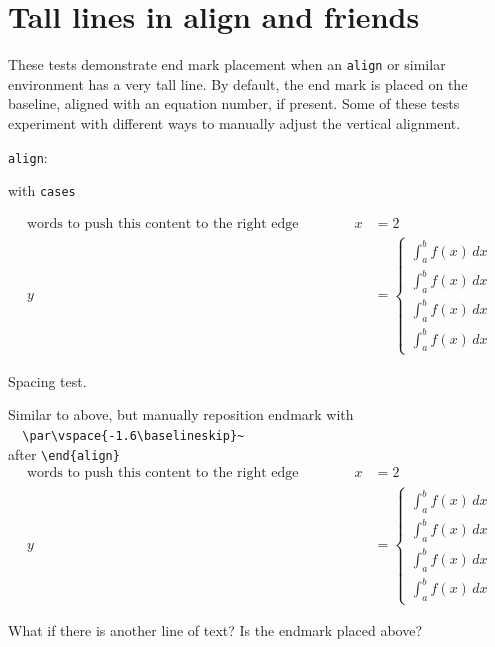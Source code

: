 \documentclass[leqno]{article}
\newcommand{\testtype}[2]{\texttt{#1}:%
  #2}
\newcommand{\makeoutertest}[3]{
  \begin{test}
    \testtype{#1}{#2}
    #3
  \end{test}
}
\newcommand{\maketest}[3]{
  \makeoutertest{#1}{#2}{
    \begin{#1}
      #3
    \end{#1}
  }
}
\begin{document}
\clearpage
\section{Tall lines in align and friends}

These tests demonstrate end mark placement when an \texttt{align} or similar environment has a very tall line.
By default, the end mark is placed on the baseline, aligned with an equation number, if present.
Some of these tests experiment with different ways to manually adjust the vertical alignment.

\maketest{align}{
  with \texttt{cases}
}{
  \text{words to push this content to the right edge}\qquad\qquad x & = 2\\
  y & =
  \begin{cases}
    \int_a^b f(x)\,dx \\
    \int_a^b f(x)\,dx \\
    \int_a^b f(x)\,dx \\
    \int_a^b f(x)\,dx 
  \end{cases}
}
Spacing test.
\emph{\color{gray}\kant[3][1-3]}
\begin{test} 
  Similar to above, but manually reposition endmark with\\
  \verb|  \par\vspace{-1.6\baselineskip}~|\\
  after \verb|\end{align}|
  \begin{align}
    \text{words to push this content to the right edge}\qquad\qquad x & = 2\\
    y & =
        \begin{cases}
          \int_a^b f(x)\,dx \\
          \int_a^b f(x)\,dx \\
          \int_a^b f(x)\,dx \\
          \int_a^b f(x)\,dx 
        \end{cases}
  \end{align}\qedprev[1.6]\hspace{0.001pt}\par\vspace{.6\baselineskip}
  What if there is another line of text?  Is the endmark placed above?
\end{test}
\end{document}
